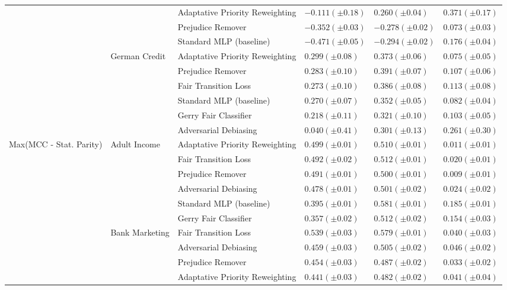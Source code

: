 \begin{tabular}{llllll}
 &  & Adaptative Priority Reweighting & $-0.111 (\pm0.18)$ & $0.260 (\pm0.04)$ & $0.371 (\pm0.17)$ \\
 &  & Prejudice Remover & $-0.352 (\pm0.03)$ & $-0.278 (\pm0.02)$ & $0.073 (\pm0.03)$ \\
 &  & Standard MLP (baseline) & $-0.471 (\pm0.05)$ & $-0.294 (\pm0.02)$ & $0.176 (\pm0.04)$ \\
\cline{2-6}
 & \multirow[t]{6}{*}{German Credit} & Adaptative Priority Reweighting & $0.299 (\pm0.08)$ & $0.373 (\pm0.06)$ & $0.075 (\pm0.05)$ \\
 &  & Prejudice Remover & $0.283 (\pm0.10)$ & $0.391 (\pm0.07)$ & $0.107 (\pm0.06)$ \\
 &  & Fair Transition Loss & $0.273 (\pm0.10)$ & $0.386 (\pm0.08)$ & $0.113 (\pm0.08)$ \\
 &  & Standard MLP (baseline) & $0.270 (\pm0.07)$ & $0.352 (\pm0.05)$ & $0.082 (\pm0.04)$ \\
 &  & Gerry Fair Classifier & $0.218 (\pm0.11)$ & $0.321 (\pm0.10)$ & $0.103 (\pm0.05)$ \\
 &  & Adversarial Debiasing & $0.040 (\pm0.41)$ & $0.301 (\pm0.13)$ & $0.261 (\pm0.30)$ \\
\cline{1-6} \cline{2-6}
\multirow[t]{24}{*}{Max(MCC - Stat. Parity)} & \multirow[t]{6}{*}{Adult Income} & Adaptative Priority Reweighting & $0.499 (\pm0.01)$ & $0.510 (\pm0.01)$ & $0.011 (\pm0.01)$ \\
 &  & Fair Transition Loss & $0.492 (\pm0.02)$ & $0.512 (\pm0.01)$ & $0.020 (\pm0.01)$ \\
 &  & Prejudice Remover & $0.491 (\pm0.01)$ & $0.500 (\pm0.01)$ & $0.009 (\pm0.01)$ \\
 &  & Adversarial Debiasing & $0.478 (\pm0.01)$ & $0.501 (\pm0.02)$ & $0.024 (\pm0.02)$ \\
 &  & Standard MLP (baseline) & $0.395 (\pm0.01)$ & $0.581 (\pm0.01)$ & $0.185 (\pm0.01)$ \\
 &  & Gerry Fair Classifier & $0.357 (\pm0.02)$ & $0.512 (\pm0.02)$ & $0.154 (\pm0.03)$ \\
\cline{2-6}
 & \multirow[t]{6}{*}{Bank Marketing} & Fair Transition Loss & $0.539 (\pm0.03)$ & $0.579 (\pm0.01)$ & $0.040 (\pm0.03)$ \\
 &  & Adversarial Debiasing & $0.459 (\pm0.03)$ & $0.505 (\pm0.02)$ & $0.046 (\pm0.02)$ \\
 &  & Prejudice Remover & $0.454 (\pm0.03)$ & $0.487 (\pm0.02)$ & $0.033 (\pm0.02)$ \\
 &  & Adaptative Priority Reweighting & $0.441 (\pm0.03)$ & $0.482 (\pm0.02)$ & $0.041 (\pm0.04)$ \\

\end{tabular}
